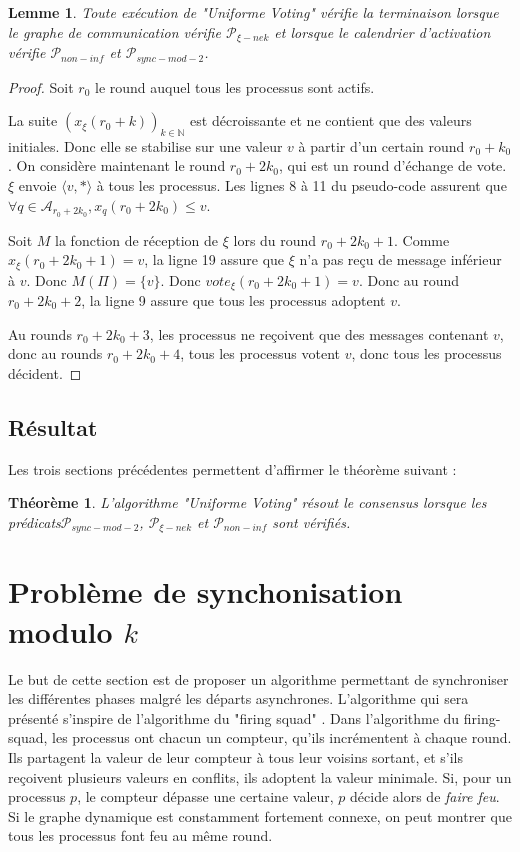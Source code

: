 \documentclass{article}
\newtheorem{lemma}{Lemme}[section]
\newtheorem{theorem}{Théorème}
\begin{document}
	\begin{lemma}
		Toute exécution de "Uniforme Voting" vérifie la terminaison lorsque le graphe de communication vérifie $\mathcal{P}_{\xi-nek}$
		et lorsque le calendrier d'activation vérifie $\mathcal{P}_{non-inf}$ et $\mathcal{P}_{sync-mod-2}$.
	\end{lemma}
	\begin{proof}
		Soit $r_0$ le round auquel tous les processus sont actifs.

		La suite $(x_\xi(r_0+k))_{k \in \mathds{N}}$ est décroissante et ne contient que des valeurs initiales. Donc elle se stabilise sur une valeur $v$ à partir d'un certain round $r_0+k_0$.
		On considère maintenant le round $r_0+2k_0$, qui est un round d'échange de vote.
		$\xi$ envoie $\langle v, * \rangle$ à tous les processus. Les lignes 8 à 11 du pseudo-code assurent que $\forall q \in \mathcal{A}_{r_0+2k_0}, x_q(r_0+2k_0) \leq v$.

		Soit $M$ la fonction de réception de $\xi$ lors du round $r_0+2k_0+1$.
		Comme $x_\xi(r_0+2k_0+1) = v$, la ligne 19 assure que $\xi$ n'a pas reçu de message inférieur à $v$.
		Donc $M(\Pi) = \{v\}$. Donc $vote_\xi(r_0+2k_0+1) = v$. Donc au round $r_0+2k_0+2$, la ligne 9 assure que tous les processus adoptent $v$.

		Au rounds $r_0+2k_0+3$, les processus ne reçoivent que des messages contenant $v$, donc au rounds $r_0+2k_0+4$, tous les processus votent $v$, donc tous les processus décident.
	\end{proof}
\subsection{Résultat}

Les trois sections précédentes permettent d'affirmer le théorème suivant :

\begin{theorem}
	L'algorithme "Uniforme Voting" résout le consensus lorsque les prédicats$\mathcal{P}_{sync-mod-2}$, $\mathcal{P}_{\xi-nek}$ et $\mathcal{P}_{non-inf}$ sont vérifiés.
\end{theorem}

\section{Problème de synchonisation modulo $k$}

Le but de cette section est de proposer un algorithme permettant de synchroniser les différentes phases malgré les départs asynchrones.
L'algorithme qui sera présenté s'inspire de l'algorithme du "firing squad" \cite{firing_squad}.
Dans l'algorithme du firing-squad, les processus ont chacun un compteur, qu'ils incrémentent à chaque round. Ils partagent la valeur de leur compteur à tous leur voisins sortant, 
et s'ils reçoivent plusieurs valeurs en conflits, ils adoptent la valeur minimale.
Si, pour un processus $p$, le compteur dépasse une certaine valeur, $p$ décide alors de \emph{faire feu}.
Si le graphe dynamique est constamment fortement connexe, on peut montrer que tous les processus font feu au même round.
\end{document}
